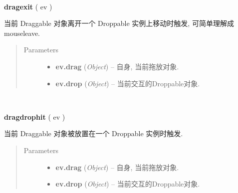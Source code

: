 \documentclass[letterpaper,10pt,english]{sphinxmanual}
\begin{document}

\begin{fulllineitems}
\label{api/component/dd/draggable:Draggable.dragexit}~
\begin{DUlineblock}{0em}
\item[] \textbf{dragexit} ( ev )
\item[] 当前 Draggable 对象离开一个 Droppable 实例上移动时触发, 可简单理解成 mouseleave.
\end{DUlineblock}
\begin{quote}\begin{description}
\item[{Parameters}] \leavevmode\begin{itemize}
\item {}
\textbf{ev.drag} (\emph{Object}) -- 自身, 当前拖放对象.

\item {}
\textbf{ev.drop} (\emph{Object}) -- 当前交互的Droppable对象.

\end{itemize}

\end{description}\end{quote}

\end{fulllineitems}



\begin{fulllineitems}
\label{api/component/dd/draggable:Draggable.dragdrophit}~
\begin{DUlineblock}{0em}
\item[] \textbf{dragdrophit} ( ev )
\item[] 当前 Draggable 对象被放置在一个 Droppable 实例时触发.
\end{DUlineblock}
\begin{quote}\begin{description}
\item[{Parameters}] \leavevmode\begin{itemize}
\item {}
\textbf{ev.drag} (\emph{Object}) -- 自身, 当前拖放对象.

\item {}
\textbf{ev.drop} (\emph{Object}) -- 当前交互的Droppable对象.

\end{itemize}

\end{description}\end{quote}

\end{fulllineitems}
\end{document}
